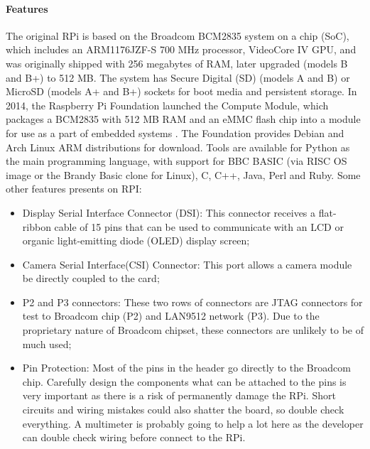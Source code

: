 \documentclass{acm_proc_article-sp}
\begin{document}
\paragraph{Features}
The original RPi is based on the Broadcom BCM2835 system on a chip (SoC)\cite{Broadcom}, which includes an ARM1176JZF-S 700 MHz processor, VideoCore IV GPU\cite{Brose}, and was originally shipped with 256 megabytes of RAM, later upgraded (models B and B+) to 512 MB\cite{raspOrg}. The system has Secure Digital (SD) (models A and B) or MicroSD (models A+ and B+) sockets for boot media and persistent storage\cite{Elinux}.
\newline
\newline
In 2014, the Raspberry Pi Foundation launched the Compute Module, which packages a BCM2835 with 512 MB RAM and an eMMC flash chip into a module for use as a part of embedded systems \cite{raspNewProduct}.
The Foundation provides Debian and Arch Linux ARM distributions for download. Tools are available for Python as the main programming language, with support for BBC BASIC (via RISC OS image or the Brandy Basic clone for Linux)\cite{Jaguar}, C, C++, Java, Perl and Ruby.
\newline
\newline
Some other features presents on RPI:
\begin{itemize}
\item Display Serial Interface Connector (DSI): This connector receives a flat-ribbon cable of 15 pins that can be used to communicate with an LCD or organic light-emitting diode (OLED) display screen;	
\item Camera Serial Interface(CSI) Connector: This port allows a camera module be directly coupled to the card;
\item P2 and P3 connectors: These two rows of connectors are JTAG connectors for test to Broadcom chip (P2) and LAN9512 network (P3). Due to the proprietary nature of Broadcom chipset, these connectors are unlikely to be of much used;
\item Pin Protection: Most of the pins in the header go directly to the Broadcom chip. Carefully design the components what can be attached to the pins is very important as there is a risk of permanently damage the RPi. Short circuits and wiring mistakes could also shatter the board, so double check everything. A multimeter is probably going to help a lot here as the developer can double check wiring before connect to the RPi.
\end{itemize}
\end{document}
